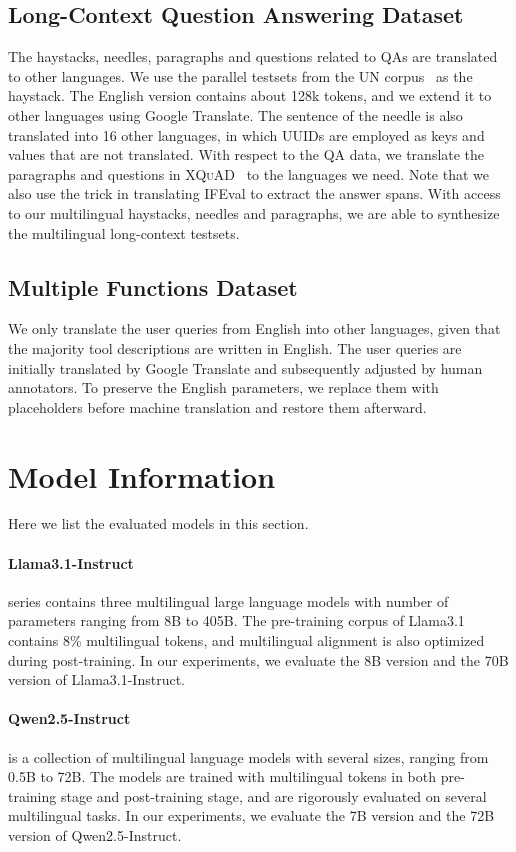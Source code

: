 \subsection{Long-Context Question Answering Dataset}
The haystacks, needles, paragraphs and questions related to QAs are translated to other languages.
We use the parallel testsets from the UN corpus~\cite{ziemski2016united} as the haystack.
The English version contains about 128k tokens, and we extend it to other languages using Google Translate.
The sentence of the needle is also translated into 16 other languages, in which UUIDs are employed as keys and values that are not translated.
With respect to the QA data, we translate the paragraphs and questions in \textsc{XQuAD}~\cite{artetxe2020cross} to the languages we need.
Note that we also use the trick in translating IFEval to extract the answer spans.
With access to our multilingual haystacks, needles and paragraphs, we are able to synthesize the multilingual long-context testsets.

\subsection{Multiple Functions Dataset}
We only translate the user queries from English into other languages, given that the majority tool descriptions are written in English.
The user queries are initially translated by Google Translate and subsequently adjusted by human annotators.
To preserve the English parameters, we replace them with placeholders before machine translation and restore them afterward.

\section{Model Information}
\label{sec:model_info}
Here we list the evaluated models in this section.

\paragraph{Llama3.1-Instruct~\cite{dubey2024llama}} series contains three multilingual large language models with number of parameters ranging from 8B to 405B.
The pre-training corpus of Llama3.1 contains 8\% multilingual tokens, and multilingual alignment is also optimized during post-training.
In our experiments, we evaluate the 8B version and the 70B version of Llama3.1-Instruct.

\paragraph{Qwen2.5-Instruct~\cite{qwen2.5}} is a collection of multilingual language models with several sizes, ranging from 0.5B to 72B.
The models are trained with multilingual tokens in both pre-training stage and post-training stage, and are rigorously evaluated on several multilingual tasks.
In our experiments, we evaluate the 7B version and the 72B version of Qwen2.5-Instruct.


